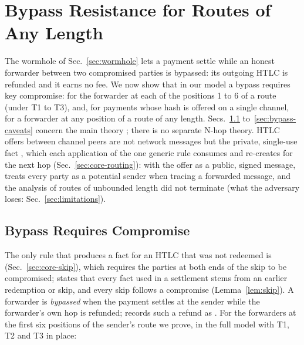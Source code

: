 \section{Bypass Resistance for Routes of Any Length}\label{sec:bypass}

The wormhole of Sec.~\ref{sec:wormhole} lets a payment settle while an honest forwarder between
two compromised parties is bypassed: its outgoing HTLC is refunded and it earns no fee. We now
show that in our model a bypass requires key compromise: for the forwarder at each of the
positions 1 to 6 of a route (under T1 to T3), and, for payments whose hash is offered on a single channel, for a
forwarder at any position of a route of any length. Secs.~\ref{sec:bypass-fixed}
to~\ref{sec:bypass-caveats} concern the main theory ; there is no separate
N-hop theory. HTLC offers between channel peers are not network messages but the private,
single-use fact , which each application of the one generic rule
 consumes and re-creates for the next hop (Sec.~\ref{sec:core-routing}): with
the offer as a public, signed message, \tamarin{} treats every party as a potential sender when
tracing a forwarded message, and the analysis of routes of unbounded length did not terminate
(what the adversary loses: Sec.~\ref{sec:limitations}).

\subsection{Bypass Requires Compromise}\label{sec:bypass-fixed}

The only rule that produces a  fact for an HTLC that was not redeemed is
 (Sec.~\ref{sec:core-skip}), which requires the parties at both ends of the
skip to be compromised;  states that every  fact used in
a settlement stems from an earlier redemption or skip, and every skip follows a compromise
(Lemma~\ref{lem:skip}). A forwarder is \emph{bypassed} when the payment settles at the sender while the forwarder's own
hop is refunded;  records such a refund as
. For the forwarders at the first six positions of the sender's
route we prove, in the full model with T1, T2 and T3 in place:

